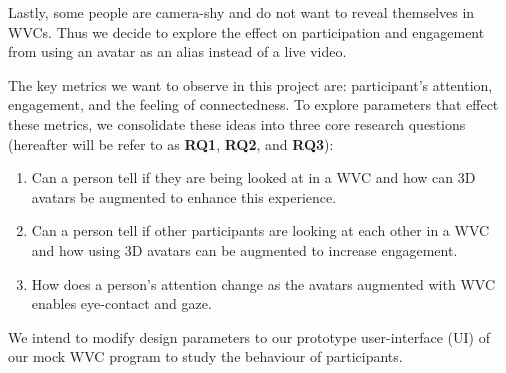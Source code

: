 Lastly, some people are camera-shy and do not want to reveal themselves in WVCs. Thus we decide to explore the effect on participation and engagement from using an avatar as an alias instead of  a live video.

The key metrics we want to observe in this project are: participant’s attention, engagement, and the feeling of connectedness. To explore parameters that effect these metrics, we consolidate these ideas into three core research questions (hereafter will be refer to as \textbf{RQ1}, \textbf{RQ2}, and \textbf{RQ3}):

\begin{enumerate}
    \item Can a person tell if they are being looked at in a WVC and how can 3D avatars be augmented to enhance this experience.
    \item Can a person tell if other participants are looking at each other in a WVC and how using 3D avatars can be augmented to increase engagement.
    \item How does a person’s attention change as the avatars augmented with WVC enables eye-contact and gaze.
\end{enumerate}

We intend to modify design parameters to our prototype user-interface (UI) of our mock WVC program to study the behaviour of participants.

